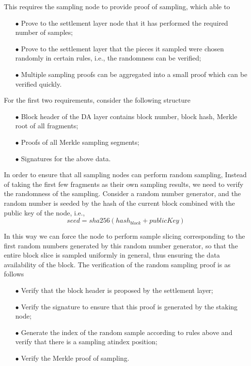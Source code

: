 \documentclass{iacrtrans}
\begin{document}
This requires the sampling node to provide proof of sampling, which able to 
\begin{itemize}
	\item[$\bullet$] Prove to the settlement layer node that it has performed the required number of samples;
	\item[$\bullet$] Prove to the settlement layer that the pieces it sampled were chosen randomly in certain rules, i.e., the randomness can be verified;
	\item[$\bullet$] Multiple sampling proofs can be aggregated into a small proof which can be verified quickly.
\end{itemize}

For the first two requirements, consider the following structure
\begin{itemize}
	\item[$\bullet$] Block header of the DA layer contains block number, block hash, Merkle root of all fragments;
	\item[$\bullet$] Proofs of all Merkle sampling segments;
	\item[$\bullet$] Signatures for the above data.
\end{itemize}

In order to ensure that all sampling nodes can perform random sampling, Instead of taking the first few fragments as their own sampling results, we need to verify the randomness of the sampling. Consider a random number generator, and the random number is seeded by the hash of the current block combined with the public key of the node, i.e.,
$$seed = sha256(hash_{block} + publicKey)$$

In this way we can force the node to perform sample slicing corresponding to the first random numbers generated by this random number generator, so that the entire block slice is sampled uniformly in general, thus ensuring the data availability of the block.
The verification of the random sampling proof is as follows
\begin{itemize}
	\item[$\bullet$] Verify that the block header is proposed by the settlement layer;
	\item[$\bullet$] Verify the signature to ensure that this proof is generated by the staking node;
	\item[$\bullet$] Generate the index of the random sample according to rules above and verify that there is a sampling atindex position;
	\item[$\bullet$] Verify the Merkle proof of sampling.
\end{itemize}
\end{document}
